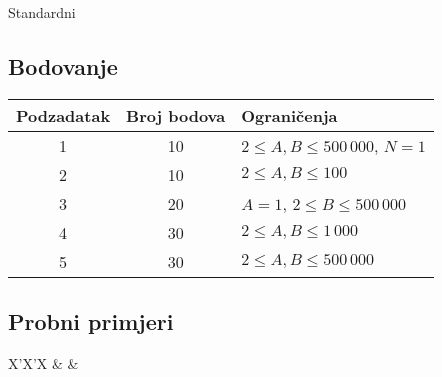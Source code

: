 \begin{statement}[
  problempoints=100,
  timelimit=1 sekunda,
  memorylimit=512 MiB,
]{Standardni}
\subsection*{Bodovanje}
{\renewcommand{\arraystretch}{1.4}
  \setlength{\tabcolsep}{6pt}
  \begin{tabular}{ccl}
 Podzadatak & Broj bodova & Ograničenja \\ \midrule
  1 & 10 & $2 \le A, B \le 500\,000$, $N = 1$\\
  2 & 10 & $2 \le A, B \le 100$ \\
  3 & 20 & $A = 1$, $2 \le B \le 500\,000$ \\
  4 & 30 & $2 \le A, B \le 1\,000$ \\
  5 & 30 & $2 \le A, B \le 500\,000$ \\
\end{tabular}}

\subsection*{Probni primjeri}
\begin{tabularx}{\textwidth}{X'X'X}
 &
 &
\end{tabularx}

\end{statement}

